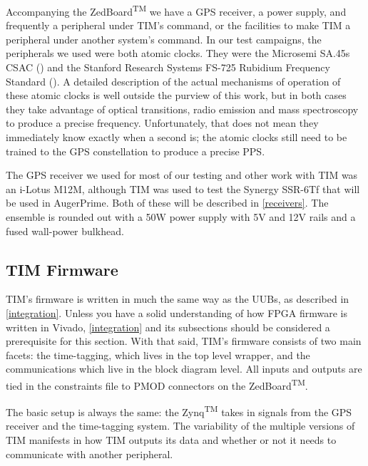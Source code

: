Accompanying the ZedBoard\textsuperscript{TM} we have a GPS receiver, a power supply, and frequently a peripheral under TIM's command, or the facilities to make TIM a peripheral under another system's command. In our test campaigns, the peripherals we used were both atomic clocks. They were the Microsemi SA.45s CSAC (\cite{csac}) and the Stanford Research Systems FS-725 Rubidium Frequency Standard (\cite{fs725spec}). A detailed description of the actual mechanisms of operation of these atomic clocks is well outside the purview of this work, but in both cases they take advantage of optical transitions, radio emission and mass spectroscopy to produce a precise frequency. Unfortunately, that does not mean they immediately know exactly when a second is; the atomic clocks still need to be trained to the GPS constellation to produce a precise PPS.

The GPS receiver we used for most of our testing and other work with TIM was an i-Lotus M12M, although TIM was used to test the Synergy SSR-6Tf that will be used in AugerPrime. Both of these will be described in \autoref{receivers}. The ensemble is rounded out with a 50W power supply with 5V and 12V rails and a fused wall-power bulkhead.

\subsection{TIM Firmware}
TIM's firmware is written in much the same way as the UUBs, as described in \autoref{integration}. Unless you have a solid understanding of how FPGA firmware is written in Vivado, \autoref{integration} and its subsections should be considered a prerequisite for this section. With that said, TIM's firmware consists of two main facets: the time-tagging, which lives in the top level wrapper, and the communications which live in the block diagram level. All inputs and outputs are tied in the constraints file to PMOD connectors on the ZedBoard\textsuperscript{TM}.

The basic setup is always the same: the Zynq\textsuperscript{TM} takes in signals from the GPS receiver and the time-tagging system. The variability of the multiple versions of TIM manifests in how TIM outputs its data and whether or not it needs to communicate with another peripheral. 

